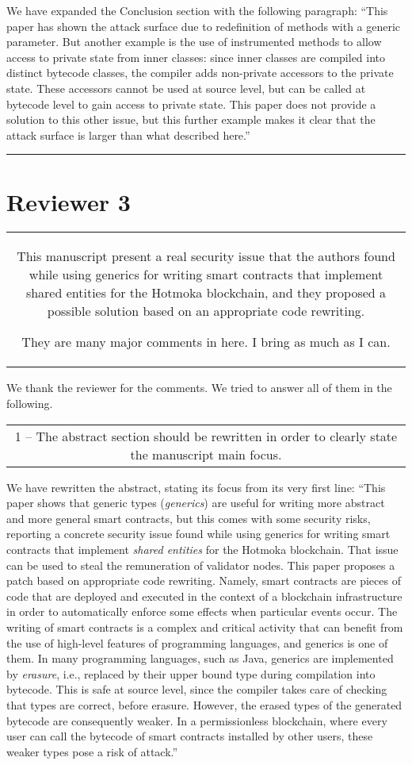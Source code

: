 \documentclass[journal,onecolumn, 11pt]{IEEEtran}
\newcommand{\BOX}[1]
{
  {\it
    \begin{center}
      \begin{tabular}{|c|}
        \hline
        \parbox{0.97\columnwidth}{
          \medskip
          #1
          \medskip} \\
        \hline
      \end{tabular}
    \end{center}
  }
}
\begin{document}
We have expanded the Conclusion section with the following paragraph:
``This paper has shown the attack surface due to redefinition of methods with a generic parameter. But another example is the use of instrumented methods to allow access to private state from inner classes: since inner classes are compiled into distinct
bytecode classes, the compiler adds non-private accessors to the private state. These accessors cannot be used at source level, but can be called at bytecode level to gain access to private state.
This paper does not provide a solution to this other issue, but this further example
makes it clear that the attack surface is larger than what described here.''






\vspace{5mm}
\hrule
\section*{\textbf{Reviewer 3}}

\BOX{
This manuscript present a real security issue that the authors found while using generics for writing smart contracts that implement shared entities for the Hotmoka blockchain, and they proposed a possible solution based on an appropriate code rewriting.

They are many major comments in here. I bring as much as I can.
}

We thank the reviewer for the comments. We tried to answer all of them in the following.

\BOX{
1 -- The abstract section should be rewritten in order to clearly state the manuscript main focus.
}

We have rewritten the abstract, stating its focus from its very first line:
``This paper shows that generic types (\emph{generics}) are useful for writing more abstract and more general smart contracts, but this comes with some security risks, reporting a concrete security issue found while using generics for writing smart contracts that implement \emph{shared entities} for the Hotmoka blockchain. That issue can be used to steal the remuneration of validator nodes. This paper proposes a patch based on appropriate code rewriting. Namely, smart contracts are pieces of code that are deployed and executed in the context of a blockchain infrastructure in order to automatically enforce some effects when particular events occur. The writing of smart contracts is a complex and critical activity that can benefit from the use of high-level features of programming languages, and generics is one of them. In many programming languages, such as Java, generics are implemented by \emph{erasure}, i.e., replaced by their upper bound type during compilation into bytecode. This is safe at source level, since the compiler takes care of checking that types are correct, before erasure. However, the erased types of the generated bytecode are consequently weaker. In a permissionless blockchain, where every user can call the bytecode of smart contracts installed by other users, these weaker types pose a risk of attack.''
\end{document}
